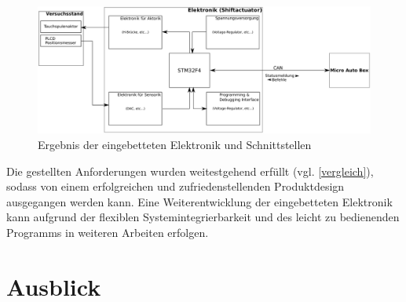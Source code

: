 \begin{figure}[H]
	\centering
		\includegraphics[width=1\linewidth]{Bilder/fazit.pdf}
	\caption{Ergebnis der eingebetteten Elektronik und Schnittstellen}
	\label{fig:fazit}
\end{figure}\noindent

Die gestellten Anforderungen wurden weitestgehend erfüllt (vgl. \autoref{vergleich}), sodass von einem erfolgreichen und zufriedenstellenden Produktdesign ausgegangen werden kann. Eine Weiterentwicklung der eingebetteten Elektronik kann aufgrund der flexiblen Systemintegrierbarkeit und des leicht zu bedienenden Programms in weiteren Arbeiten erfolgen. 

\section{Ausblick} 

